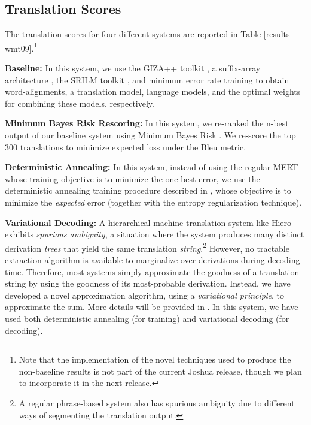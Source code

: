 \documentclass[11pt]{article}
\begin{document}
\subsection{Translation Scores}
The translation scores for four different systems are reported in Table \ref{results-wmt09}.\footnote{Note that the implementation of the novel techniques used to produce the non-baseline results is not part of the current Joshua release, though we plan to incorporate it in the next release.}


\textbf{Baseline: } In this system, we use the GIZA++ toolkit \cite{Och2003}, a suffix-array architecture \cite{Lopez2007}, the SRILM toolkit \cite{Stolcke2002}, and minimum error rate training \cite{Och2003c} to obtain word-alignments, a translation model, language models, and the optimal weights for combining these models, respectively.


\textbf{Minimum Bayes Risk Rescoring: } In this system, we re-ranked the n-best output of our baseline system using Minimum Bayes Risk \cite{Kumar2004b}.  We re-score the top 300 translations to minimize expected loss under the Bleu metric.

\textbf{Deterministic Annealing: } In this system, instead of using the regular MERT \cite{Och2003c} whose training objective is to minimize the one-best error, we use the deterministic annealing training procedure described in , whose objective is to minimize the \emph{expected} error (together with the entropy regularization technique).

\textbf{Variational Decoding: }  A hierarchical machine translation system like Hiero exhibits \emph{spurious ambiguity}, a situation where the system
produces many distinct derivation \emph{trees} that yield the same translation \emph{string}.\footnote{A regular phrase-based system also has spurious ambiguity due to different ways of segmenting the translation output.} However, no tractable extraction algorithm is available to marginalize over derivations during decoding time. Therefore, most systems simply approximate the goodness of a translation string by using the goodness of its most-probable derivation. Instead, we have developed a novel approximation algorithm, using a \emph{variational principle}, to approximate the sum.
More details will be provided in . In this system, we have used both deterministic annealing (for training) and variational decoding (for decoding).
\end{document}
